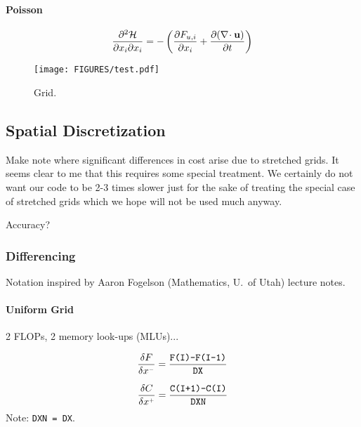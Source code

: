 \documentclass[11pt]{article}
\begin{document}
\paragraph{Poisson}

\begin{equation}
\label{eqn_poisson}
\frac{\partial^2 \cal H}{\partial x_i \partial x_i} = - \left(\frac{\partial F_{u,i}}{\partial x_i} + \frac{\partial (\nabla\!\cdot \mathbf{u}) }{\partial t}\right)
\end{equation}

\begin{figure}[t]
   \begin{center}
      \texttt{[image: FIGURES/test.pdf]}
      \caption{\label{fig_grid} \small Grid.}
   \end{center}
\end{figure}

\subsection{Spatial Discretization}

Make note where significant differences in cost arise due to stretched grids.  It seems clear to me that this requires some special treatment.  We certainly do not want our code to be 2-3 times slower just for the sake of treating the special case of stretched grids which we hope will not be used much anyway.

Accuracy?

\subsubsection{Differencing}

Notation inspired by Aaron Fogelson (Mathematics, U.~of Utah) lecture notes.

\paragraph {Uniform Grid} 2 FLOPs, 2 memory look-ups (MLUs)...

\begin{equation}
\label{eqn_difference_operator_uniform_face}
\frac{\delta F}{\delta x^{\scriptscriptstyle -}} = \frac{\mbox{\tt F(I)-F(I-1)}}{\mbox{\tt DX}}
\end{equation}

\begin{equation}
\label{eqn_difference_operator_uniform_cell}
\frac{\delta C}{\delta x^{\scriptscriptstyle +}} = \frac{\mbox{\tt C(I+1)-C(I)}}{\mbox{\tt DXN}}
\end{equation}
Note: {\tt DXN = DX}.
\end{document}
